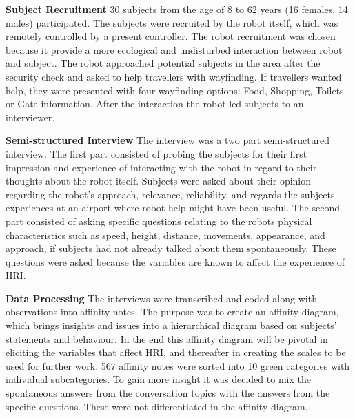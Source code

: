 \documentclass[paperwidth=160cm,paperheight=100cm,landscape,fontscale=0.2941]{baposter}
\begin{document}
\begin{poster}
{%
%
\textbf{Subject Recruitment}
30 subjects from the age of 8 to 62 years (16 females, 14 males) participated. The subjects were recruited by the robot itself, which was remotely controlled by a present controller. The robot recruitment was chosen because it provide a more ecological and undisturbed interaction between robot and subject. The robot approached potential subjects in the area after the security check and asked to help travellers with wayfinding. If travellers wanted help, they were presented with four wayfinding options: Food, Shopping, Toilets or Gate information. After the interaction the robot led subjects to an interviewer. 

\textbf{Semi-structured Interview}
The interview was a two part semi-structured interview. The first part consisted of probing the subjects for their first impression and experience of interacting with the robot in regard to their thoughts about the robot itself. Subjects were asked about their opinion regarding the robot's approach, relevance, reliability, and regards the subjects experiences at an airport where robot help might have been useful. The second part consisted of asking specific questions relating to the robots physical characteristics such as speed, height, distance, movements, appearance, and approach, if subjects had not already talked about them spontaneously. These questions were asked because the variables are known to affect the experience of HRI.

\textbf{Data Processing}
The interviews were transcribed and coded along with observations into affinity notes. The purpose was to create an affinity diagram, which brings insights and issues into a hierarchical diagram based on subjects' statements and behaviour. In the end this affinity diagram will be pivotal in eliciting the variables that affect HRI, and thereafter in creating the scales to be used for further work. 
567 affinity notes were sorted into 10 green categories with individual subcategories. To gain more insight it was decided to mix the spontaneous answers from the conversation topics with the answers from the specific questions. These were not differentiated in the affinity diagram.
}



\end{poster}
\end{document}
